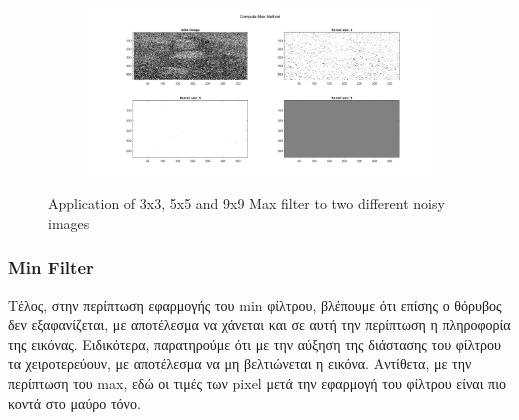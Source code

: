 \documentclass{article}
\begin{document}
\begin{figure}[h!]
\begin{subfigure}[t]{0.5\textwidth}
			\includegraphics[height=\linewidth, width=\linewidth]{./output_images/img_noisy_2_max.jpg}
		\end{subfigure}	
		\caption{Application of 3x3, 5x5 and 9x9 Max filter to two different noisy images}
	\end{figure}
	
\pagebreak
\subsubsection*{Min Filter}
	Τέλος, στην περίπτωση εφαρμογής του min φίλτρου, βλέπουμε ότι επίσης ο θόρυβος δεν εξαφανίζεται, με αποτέλεσμα να χάνεται και σε αυτή την περίπτωση η πληροφορία της εικόνας. Ειδικότερα, παρατηρούμε ότι με την αύξηση της διάστασης του φίλτρου τα χειροτερεύουν, με αποτέλεσμα να μη βελτιώνεται η εικόνα. Αντίθετα, με την περίπτωση του max, εδώ οι τιμές των pixel μετά την εφαρμογή του φίλτρου είναι πιο κοντά στο μαύρο τόνο.\\
	
\end{document}
